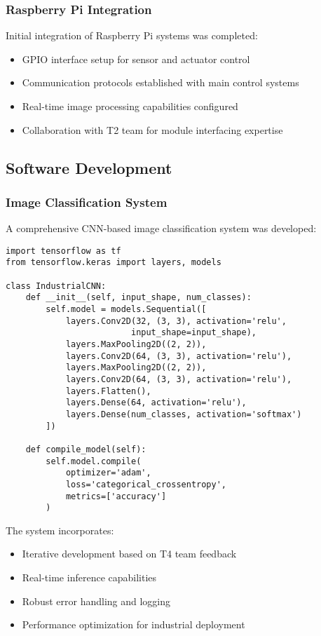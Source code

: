 \documentclass[12pt]{article}
\begin{document}
\subsubsection{Raspberry Pi Integration}
Initial integration of Raspberry Pi systems was completed:
\begin{itemize}
\item GPIO interface setup for sensor and actuator control
\item Communication protocols established with main control systems
\item Real-time image processing capabilities configured
\item Collaboration with T2 team for module interfacing expertise
\end{itemize}

\subsection{Software Development}

\subsubsection{Image Classification System}
A comprehensive CNN-based image classification system was developed:

\begin{lstlisting}[style=pythonstyle, caption={CNN Architecture Implementation}]
import tensorflow as tf
from tensorflow.keras import layers, models

class IndustrialCNN:
    def __init__(self, input_shape, num_classes):
        self.model = models.Sequential([
            layers.Conv2D(32, (3, 3), activation='relu', 
                         input_shape=input_shape),
            layers.MaxPooling2D((2, 2)),
            layers.Conv2D(64, (3, 3), activation='relu'),
            layers.MaxPooling2D((2, 2)),
            layers.Conv2D(64, (3, 3), activation='relu'),
            layers.Flatten(),
            layers.Dense(64, activation='relu'),
            layers.Dense(num_classes, activation='softmax')
        ])
        
    def compile_model(self):
        self.model.compile(
            optimizer='adam',
            loss='categorical_crossentropy',
            metrics=['accuracy']
        )
\end{lstlisting}

The system incorporates:
\begin{itemize}
\item Iterative development based on T4 team feedback
\item Real-time inference capabilities
\item Robust error handling and logging
\item Performance optimization for industrial deployment
\end{itemize}
\end{document}
